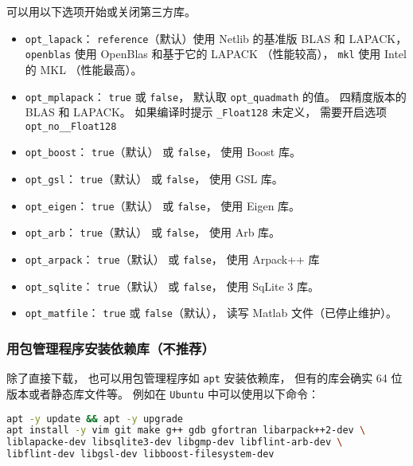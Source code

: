 可以用以下选项开始或关闭第三方库。
\begin{itemize}
\item \verb|opt_lapack|： \verb|reference|（默认）使用 Netlib 的基准版 BLAS 和 LAPACK， \verb|openblas| 使用 OpenBlas 和基于它的 LAPACK （性能较高）， \verb|mkl| 使用 Intel 的 MKL （性能最高）。
\item \verb|opt_mplapack|： \verb|true| 或 \verb|false|， 默认取 \verb|opt_quadmath| 的值。 四精度版本的 BLAS 和 LAPACK。 如果编译时提示 \verb|_Float128| 未定义， 需要开启选项 \verb|opt_no__Float128|
\item \verb|opt_boost|： \verb|true|（默认） 或 \verb|false|， 使用 Boost 库。
\item \verb|opt_gsl|： \verb|true|（默认） 或 \verb|false|， 使用 GSL 库。
\item \verb|opt_eigen|： \verb|true|（默认） 或 \verb|false|， 使用 Eigen 库。
\item \verb|opt_arb|： \verb|true|（默认） 或 \verb|false|， 使用 Arb 库。
\item \verb|opt_arpack|： \verb|true|（默认） 或 \verb|false|， 使用 Arpack++ 库
\item \verb|opt_sqlite|： \verb|true|（默认） 或 \verb|false|， 使用 SqLite 3 库。
\item \verb|opt_matfile|： \verb|true| 或 \verb|false|（默认）， 读写 Matlab 文件（已停止维护）。
\end{itemize}

\subsubsection{用包管理程序安装依赖库（不推荐）}
除了直接下载， 也可以用包管理程序如 \verb|apt| 安装依赖库， 但有的库会确实 64 位版本或者静态库文件等。 例如在 \verb|Ubuntu| 中可以使用以下命令： 
\begin{lstlisting}[language=bash]
apt -y update && apt -y upgrade
apt install -y vim git make g++ gdb gfortran libarpack++2-dev \
liblapacke-dev libsqlite3-dev libgmp-dev libflint-arb-dev \
libflint-dev libgsl-dev libboost-filesystem-dev
\end{lstlisting}
